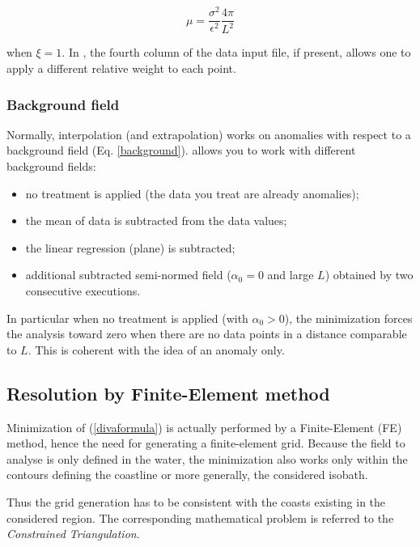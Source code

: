 \begin{equation}
\mu=\frac{\sigma^{2}}{\epsilon^{2}} \frac{4 \pi}{L^{2}}
\end{equation}


when $\xi=1$. In  \diva, the fourth column of the data input file, if present, allows one 
to apply a different relative weight to each point. 


\subsubsection{Background field\label{sec:backgroundfield}}

Normally, interpolation (and extrapolation) works on anomalies with respect to a background field (Eq. \ref{background}). \diva allows you to work with different background fields:

\begin{itemize}
\item no treatment is applied (the data you treat are already anomalies);
\item the mean of data is subtracted from the data values;
\item the linear regression (plane) is subtracted;
\item additional subtracted semi-normed field ($\alpha_0=0$ and large $L$) obtained by two consecutive \diva executions. %
\end{itemize}

In particular when no treatment is applied (with $\alpha_0 > 0$), the minimization forces the analysis toward zero when there are no
data points in a distance comparable to $L$. This is coherent with the idea of an anomaly only.

\subsection{Resolution by Finite-Element method\label{sec:finiteelements}}

Minimization of (\ref{divaformula}) is actually performed by a Finite-Element (FE) method, hence the need for generating a finite-element grid. 
Because the field to analyse is only defined in the water, the minimization also works only within the contours defining the coastline or more generally, the considered isobath.

Thus the grid generation has to be consistent with the coasts existing in the considered region. The corresponding mathematical problem is referred to the \textit{Constrained Triangulation}. %

